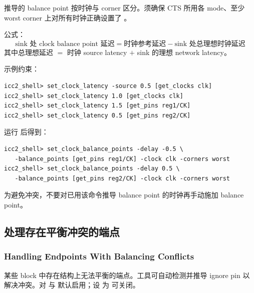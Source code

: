 推导的 balance point 按时钟与 corner 区分。须确保 CTS 所用各 mode、至少 worst corner 上对所有时钟正确设置了 。

公式：
\[
\text{sink 处 clock balance point 延迟} = \text{时钟参考延迟} - \text{sink 处总理想时钟延迟}
\]
其中总理想延迟 $=$ 时钟 source latency $+$ sink 的理想 network latency。

示例约束：
\begin{lstlisting}
icc2_shell> set_clock_latency -source 0.5 [get_clocks clk]
icc2_shell> set_clock_latency 1.0 [get_clocks clk]
icc2_shell> set_clock_latency 1.5 [get_pins reg1/CK]
icc2_shell> set_clock_latency 0.5 [get_pins reg2/CK]
\end{lstlisting}
运行  后得到：
\begin{lstlisting}
icc2_shell> set_clock_balance_points -delay -0.5 \
   -balance_points [get_pins reg1/CK] -clock clk -corners worst
icc2_shell> set_clock_balance_points -delay 0.5 \
   -balance_points [get_pins reg2/CK] -clock clk -corners worst
\end{lstlisting}
为避免冲突，不要对已用该命令推导 balance point 的时钟再手动施加 balance point。

\subsection{处理存在平衡冲突的端点}
\subsubsection*{Handling Endpoints With Balancing Conflicts}

某些 block 中存在结构上无法平衡的端点。工具可自动检测并推导 ignore pin 以解决冲突。对  与  默认启用；设  为  可关闭。


